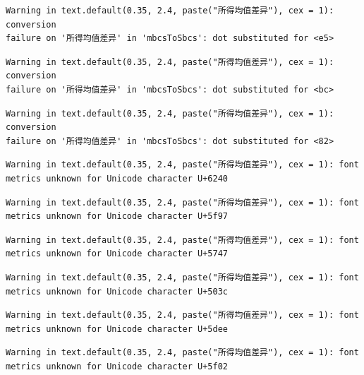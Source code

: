 \documentclass[
  letterpaper,
  DIV=11,
  numbers=noendperiod]{scrreprt}
\begin{document}
\begin{verbatim}
Warning in text.default(0.35, 2.4, paste("所得均值差异"), cex = 1): conversion
failure on '所得均值差异' in 'mbcsToSbcs': dot substituted for <e5>
\end{verbatim}

\begin{verbatim}
Warning in text.default(0.35, 2.4, paste("所得均值差异"), cex = 1): conversion
failure on '所得均值差异' in 'mbcsToSbcs': dot substituted for <bc>
\end{verbatim}

\begin{verbatim}
Warning in text.default(0.35, 2.4, paste("所得均值差异"), cex = 1): conversion
failure on '所得均值差异' in 'mbcsToSbcs': dot substituted for <82>
\end{verbatim}

\begin{verbatim}
Warning in text.default(0.35, 2.4, paste("所得均值差异"), cex = 1): font
metrics unknown for Unicode character U+6240
\end{verbatim}

\begin{verbatim}
Warning in text.default(0.35, 2.4, paste("所得均值差异"), cex = 1): font
metrics unknown for Unicode character U+5f97
\end{verbatim}

\begin{verbatim}
Warning in text.default(0.35, 2.4, paste("所得均值差异"), cex = 1): font
metrics unknown for Unicode character U+5747
\end{verbatim}

\begin{verbatim}
Warning in text.default(0.35, 2.4, paste("所得均值差异"), cex = 1): font
metrics unknown for Unicode character U+503c
\end{verbatim}

\begin{verbatim}
Warning in text.default(0.35, 2.4, paste("所得均值差异"), cex = 1): font
metrics unknown for Unicode character U+5dee
\end{verbatim}

\begin{verbatim}
Warning in text.default(0.35, 2.4, paste("所得均值差异"), cex = 1): font
metrics unknown for Unicode character U+5f02
\end{verbatim}
\end{document}

